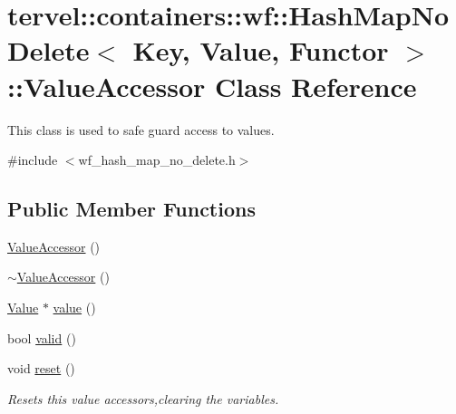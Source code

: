\hypertarget{classtervel_1_1containers_1_1wf_1_1_hash_map_no_delete_1_1_value_accessor}{}\section{tervel\+:\+:containers\+:\+:wf\+:\+:Hash\+Map\+No\+Delete$<$ Key, Value, Functor $>$\+:\+:Value\+Accessor Class Reference}
\label{classtervel_1_1containers_1_1wf_1_1_hash_map_no_delete_1_1_value_accessor}


This class is used to safe guard access to values.  




{\ttfamily \#include $<$wf\+\_\+hash\+\_\+map\+\_\+no\+\_\+delete.\+h$>$}

\subsection*{Public Member Functions}
\begin{DoxyCompactItemize}
\item 
\hyperlink{classtervel_1_1containers_1_1wf_1_1_hash_map_no_delete_1_1_value_accessor_a17de96d4fed12a69e2647d5bd34a5ff8}{Value\+Accessor} ()
\item 
\hyperlink{classtervel_1_1containers_1_1wf_1_1_hash_map_no_delete_1_1_value_accessor_a210c575aeca4a00804b78af1200c05c4}{$\sim$\+Value\+Accessor} ()
\item 
\hyperlink{hash__map_2test_object_8h_ad777bf08d8e2b01df17ba5e3c51ae11f}{Value} $\ast$ \hyperlink{classtervel_1_1containers_1_1wf_1_1_hash_map_no_delete_1_1_value_accessor_acf5a7975064652eacc15c034fe6391b6}{value} ()
\item 
bool \hyperlink{classtervel_1_1containers_1_1wf_1_1_hash_map_no_delete_1_1_value_accessor_aa0a24d417644c8967086d1c80a3e6554}{valid} ()
\item 
void \hyperlink{classtervel_1_1containers_1_1wf_1_1_hash_map_no_delete_1_1_value_accessor_aa1e3978b97fda613c947ec71147dcbee}{reset} ()
\begin{DoxyCompactList}\small\item\em Resets this value accessors,clearing the variables. \end{DoxyCompactList}\end{DoxyCompactItemize}
